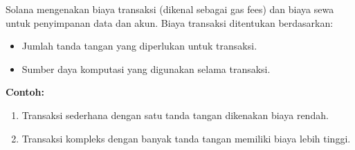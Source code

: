 Solana mengenakan biaya transaksi (dikenal sebagai gas fees) dan biaya sewa untuk penyimpanan data dan akun. Biaya transaksi ditentukan berdasarkan:
\begin{itemize}
	\item Jumlah tanda tangan yang diperlukan untuk transaksi.
	\item Sumber daya komputasi yang digunakan selama transaksi.
\end{itemize}

\textbf{Contoh:}
\begin{enumerate}
	\item Transaksi sederhana dengan satu tanda tangan dikenakan biaya rendah.
	\item Transaksi kompleks dengan banyak tanda tangan memiliki biaya lebih tinggi.
\end{enumerate}
